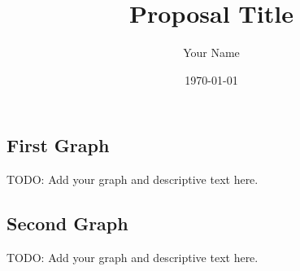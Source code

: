 \documentclass[11pt]{article} %
\title{Proposal Title}
\author{Your Name}
\date{\today}
\begin{document}
\maketitle


\subsection*{First Graph}
\label{sec:graph1}

TODO: Add your graph and descriptive text here.


\subsection*{Second Graph}
\label{sec:graph2}

TODO: Add your graph and descriptive text here.
\end{document}
